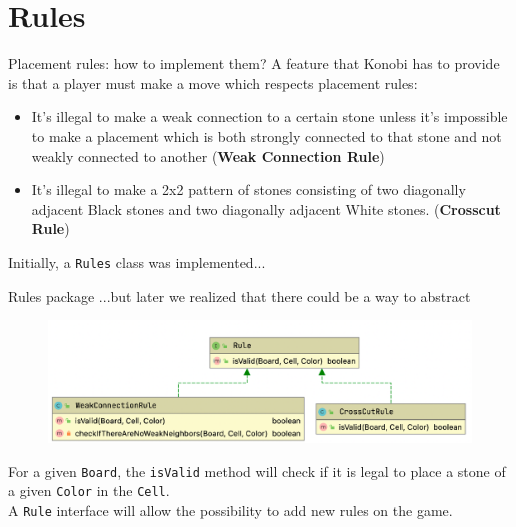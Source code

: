 \documentclass{beamer}
\begin{document}
      
      
      
\section{Rules}

\begin{frame}{Placement rules: how to implement them?}
 A feature that Konobi has to provide is that a player must make a move which respects placement rules:
 \vspace{0.3cm}
 
 \begin{itemize}
  \item It's illegal to make a weak connection to a certain stone unless it's impossible to make a placement which is both strongly connected to that stone and not weakly connected to another (\textbf{Weak Connection Rule})
  \item It's illegal to make a 2x2 pattern of stones consisting of two diagonally adjacent Black stones and two diagonally adjacent White stones. (\textbf{Crosscut Rule})
 \end{itemize}

 \vspace{0.2cm}
 
 Initially, a \texttt{Rules} class was implemented... 
\end{frame}

\begin{frame}{Rules package}
 ...but later we realized that there could be a way to abstract
 \begin{figure}
  \includegraphics[scale=0.4]{images/rules-uml.png}
 \end{figure}
 
 For a given \texttt{Board}, the \texttt{isValid} method will check if it is legal to place a stone of a given \texttt{Color} in the \texttt{Cell}. \\
 \vspace{0.1cm}
 A \texttt{Rule} interface will allow the possibility to add new rules on the game.
 
\end{frame}
\end{document}
